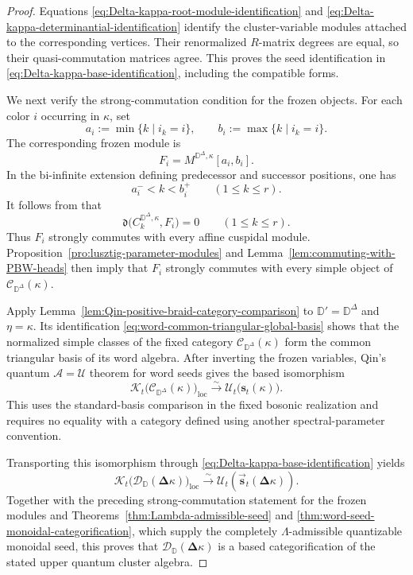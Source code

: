 \documentclass[12pt, reqno]{amsart}
\theoremstyle{plain}
\theoremstyle{definition}
\numberwithin{equation}{section}
\newcommand{\DD}{\mathbb{D}}
\begin{document}
\begin{proof}
Equations
\eqref{eq:Delta-kappa-root-module-identification} and
\eqref{eq:Delta-kappa-determinantial-identification} identify the
cluster-variable modules attached to the corresponding vertices.
Their renormalized \(R\)-matrix degrees are equal, so their
quasi-commutation matrices agree. This proves the seed identification
in \eqref{eq:Delta-kappa-base-identification}, including the
compatible forms.

We next verify the strong-commutation condition for the frozen
objects. For each color \(i\) occurring in \(\kappa\), set
\[
    a_i:=\min\{k\mid i_k=i\},
    \qquad
    b_i:=\max\{k\mid i_k=i\}.
\]
The corresponding frozen module is
\[
    F_i=M^{\DD^\Delta,\kappa}[a_i,b_i].
\]
In the bi-infinite extension defining predecessor and successor
positions, one has
\[
    a_i^-<k<b_i^+
    \qquad(1\leq k\leq r).
\]
It follows from
\cite[Lemma~5.12]{kashiwara2025monoidal} that
\[
    \mathfrak d
    \bigl(C_k^{\DD^\Delta,\kappa},F_i\bigr)
    =
    0
    \qquad(1\leq k\leq r).
\]
Thus \(F_i\) strongly commutes with every affine cuspidal module.
Proposition~\ref{pro:lusztig-parameter-modules} and
Lemma~\ref{lem:commuting-with-PBW-heads} then imply that \(F_i\)
strongly commutes with every simple object of
\(\mathscr C_{\DD^\Delta}(\kappa)\).

Apply Lemma~\ref{lem:Qin-positive-braid-category-comparison}
to \(\DD'=\DD^\Delta\) and \(\eta=\kappa\).
Its identification \eqref{eq:word-common-triangular-global-basis}
shows that the normalized simple classes of the fixed category
\(\mathscr C_{\DD^\Delta}(\kappa)\) form the common triangular
basis of its word algebra. After inverting the frozen variables,
Qin's quantum \(\mathcal A=\mathcal U\) theorem for word seeds
\cite[Theorem~8.10(3)]{qin2024analogs} gives the based isomorphism
\[
 \mathcal K_t\bigl(\mathscr C_{\DD^\Delta}(\kappa)\bigr)_{\mathrm{loc}}
 \xrightarrow{\sim}
 \mathcal U_t\bigl(\mathbf s_t(\kappa)\bigr).
\]
This uses the standard-basis comparison in the fixed bosonic
realization and requires no equality with a category defined using
another spectral-parameter convention.

Transporting this isomorphism through
\eqref{eq:Delta-kappa-base-identification} yields
\[
    \mathcal K_t\bigl(
        \mathscr D_{\DD}(\boldsymbol{\Delta}\kappa)
    \bigr)_{\mathrm{loc}}
    \xrightarrow{\sim}
    \mathcal U_t\left(
        \overrightarrow{\mathbf s}_t
        (\boldsymbol{\Delta}\kappa)
    \right).
\]
Together with the preceding strong-commutation statement for the
frozen modules and
Theorems~\ref{thm:Lambda-admissible-seed} and
\ref{thm:word-seed-monoidal-categorification}, which supply the
completely \(\Lambda\)-admissible quantizable monoidal seed, this
proves that
\(\mathscr D_{\DD}(\boldsymbol{\Delta}\kappa)\) is a based
categorification of the stated upper quantum cluster algebra.
\end{proof}
\end{document}
